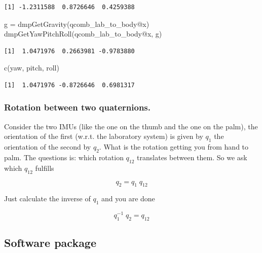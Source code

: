 \documentclass[
  letterpaper,
  DIV=11,
  numbers=noendperiod]{scrartcl}
\newenvironment{Shaded}{\begin{snugshade}}{\end{snugshade}}
\newcommand{\FunctionTok}[1]{\textcolor[rgb]{0.28,0.35,0.67}{#1}}
\newcommand{\NormalTok}[1]{\textcolor[rgb]{0.00,0.23,0.31}{#1}}
\newcommand{\OtherTok}[1]{\textcolor[rgb]{0.00,0.23,0.31}{#1}}
\newcommand{\SpecialCharTok}[1]{\textcolor[rgb]{0.37,0.37,0.37}{#1}}
\begin{document}
\begin{verbatim}
[1] -1.2311588  0.8726646  0.4259388
\end{verbatim}

\begin{Shaded}
\begin{Highlighting}[]
\NormalTok{g }\OtherTok{=} \FunctionTok{dmpGetGravity}\NormalTok{(qcomb\_lab\_to\_body}\SpecialCharTok{@}\NormalTok{x)}
\FunctionTok{dmpGetYawPitchRoll}\NormalTok{(qcomb\_lab\_to\_body}\SpecialCharTok{@}\NormalTok{x, g)}
\end{Highlighting}
\end{Shaded}

\begin{verbatim}
[1]  1.0471976  0.2663981 -0.9783880
\end{verbatim}

\begin{Shaded}
\begin{Highlighting}[]
\FunctionTok{c}\NormalTok{(yaw, pitch, roll)}
\end{Highlighting}
\end{Shaded}

\begin{verbatim}
[1]  1.0471976 -0.8726646  0.6981317
\end{verbatim}

\hypertarget{rotation-between-two-quaternions.}{%
\subsubsection{Rotation between two
quaternions.}\label{rotation-between-two-quaternions.}}

Consider the two IMUs (like the one on the thumb and the one on the
palm), the orientation of the first (w.r.t. the laboratory system) is
given by \(q_1\) the orientation of the second by \(q_2\). What is the
rotation getting you from hand to palm. The questions is: which rotation
\(q_{12}\) translates between them. So we ask which \(q_12\) fulfills

\[
  q_2 = q_1 \; q_{12} 
\]

Just calculate the inverse of \(q_1\) and you are done

\[
  q_1^{-1} \; q_2 = q_{12}  
\]

\hypertarget{software-package}{%
\subsection{Software package}\label{software-package}}
\end{document}
